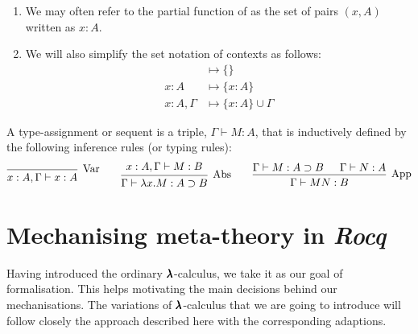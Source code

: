 \begin{notation} \hfill
  \begin{enumerate}
  \item We may often refer to the partial function of as the set of pairs $(x, A)$ written as $x:A$.
  \item We will also simplify the set notation of contexts as follows:
    \begin{align*}
      &\mapsto \{ \} \\
      x:A         &\mapsto \{ x:A \} \\
      x:A, \Gamma &\mapsto \{ x:A \} \cup \Gamma
    \end{align*}
  \end{enumerate}
\end{notation}

\begin{definition}
  A type-assignment or sequent is a triple, $\Gamma \vdash M:A$, that is inductively defined by the following inference rules (or typing rules):
  \[
    \begin{prooftree}
      \infer0[Var]{ x:A, \Gamma \vdash x:A } 
    \end{prooftree}
    \qquad
    \begin{prooftree}
      \hypo{ x:A, \Gamma \vdash M:B }
      \infer1[Abs]{ \Gamma \vdash \lambda x . M : A \supset B  } 
    \end{prooftree}
    \qquad
    \begin{prooftree}
      \hypo{ \Gamma \vdash M : A \supset B }
      \hypo{ \Gamma \vdash N : A }	
      \infer2[App]{ \Gamma \vdash M N : B } 
    \end{prooftree}
  \]
\end{definition}


\section{Mechanising meta-theory in \textit{Rocq}}

Having introduced the ordinary $\pmb{\lambda}$-calculus, we take it as our goal of formalisation.
This helps motivating the main decisions behind our mechanisations.
The variations of $\pmb{\lambda}$-calculus that we are going to introduce will follow closely the approach described here with the corresponding adaptions.


